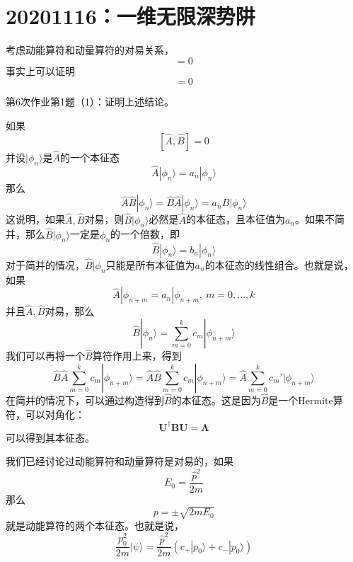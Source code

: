     \section{20201116：一维无限深势阱}
        考虑动能算符和动量算符的对易关系，
        \begin{equation*}
            [\frac {\hat{p}^2}{2m}, \hat{p}] = 0
        \end{equation*}
        事实上可以证明
        \begin{equation*}
            [f(\hat{A}),g(\hat{A})] = 0
        \end{equation*}
        \begin{asg}
            第6次作业第1题（1）：证明上述结论。
        \end{asg}
        如果
        \[ [\hat{A},\hat{B}]=0 \]
        并设$|\phi_n\rangle$是$\hat{A}$的一个本征态
        \[ \hat{A} |\phi_n \rangle = a_n |\phi_n \rangle \]
        那么
        \[ \hat{A} \hat{B} |\phi_n \rangle = \hat{B}\hat{A} |\phi_n \rangle = a_n \hat{B} |\phi_n \rangle \]
        这说明，如果$\hat{A},\hat{B}$对易，则$\hat{B}|\phi_n\rangle$必然是$\hat{A}$的本征态，且本征值为$a_n$。如果不简并，那么$\hat{B}|\phi_n\rangle$一定是$\phi_n$的一个倍数，即
        \begin{equation*}
            \hat{B}|\phi_n \rangle = b_n |\phi_n \rangle
        \end{equation*}
        对于简并的情况，$\hat{B}|\phi_n$只能是所有本征值为$a_n$的本征态的线性组合。也就是说，如果
        \[ \hat{A}|\phi_{n+m} = a_n |\phi_{n+m},\ m=0,...,k\]
        并且$\hat{A},\hat{B}$对易，那么
        \[ \hat{B}|\phi_n \rangle = \sum_{m=0}^k c_m |\phi_{n+m} \rangle \]
        我们可以再将一个$\hat{B}$算符作用上来，得到
        \[ \hat{B}\hat{A} \sum_{m=0}^k c_m|\phi_{n+m}\rangle = \hat{A} \hat{B} \sum_{m=0}^k c_m|\phi_{n+m} \rangle = \hat{A} \sum_{m=0}^k c_m'|\phi_{n+m} \rangle \]
        在简并的情况下，可以通过构造得到$\hat{B}$的本征态。这是因为$\hat{B}$是一个Hermite算符，可以对角化：
        \[ \bm{U}^\dagger \bm{BU} = \bm{\Lambda} \]
        可以得到其本征态。

        我们已经讨论过动能算符和动量算符是对易的，如果
        \[ E_0 = \frac {\hat{p}^2}{2m} \]
        那么
        \[ p = \pm \sqrt{2mE_0} \]
        就是动能算符的两个本征态。也就是说，
        \[ \frac {p_0^2}{2m} |\psi\rangle = \frac {\hat{p}^2}{2m} (c_+|p_0\rangle + c_-|p_0\rangle) \]

